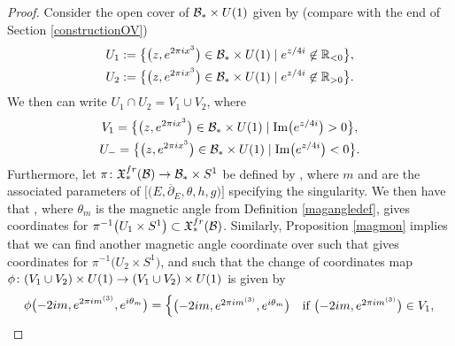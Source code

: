 \documentclass[11pt]{article}
\numberwithin{equation}{section}
\numberwithin{equation}{section}
\begin{document}
\begin{proof}
Consider the open cover of $\mathcal{B}_*\times {\rm U}(1)$ given by (compare with the end of Section \ref{constructionOV})
\begin{gather*}
 U_1:=\bigl\{\bigl(z,{\rm e}^{2\pi{\rm i}x^{3}}\bigr) \in \mathcal{B}_*\times {\rm U}(1) \mid {\rm e}^{z/4{\rm i}}\not\in \mathbb{R}_{<0} \bigr\}, \\
 U_2:=\bigl\{\bigl(z,{\rm e}^{2\pi{\rm i}x^{3}}\bigr) \in \mathcal{B}_*\times {\rm U}(1) \mid {\rm e}^{z/4{\rm i}}\not\in \mathbb{R}_{>0} \bigr\}.
\end{gather*}
We then can write $U_1\cap U_2= V_1\cup V_2$, where
\begin{gather*}
 V_1=\bigl\{\bigl(z,{\rm e}^{2\pi {\rm i}x^3}\bigr) \in \mathcal{B}_*\times {\rm U}(1) \mid \operatorname{Im}\bigl({\rm e}^{z/4{\rm i}}\bigr)>0\bigr\}, \\
 U_{-}=\bigl\{\bigl(z,{\rm e}^{2\pi {\rm i}x^3}\bigr) \in \mathcal{B}_*\times {\rm U}(1) \mid \operatorname{Im}\bigl({\rm e}^{z/4{\rm i}}\bigr)<0\bigr\}.
\end{gather*}
Furthermore, let $\pi\colon \mathfrak{X}_*^{{\rm fr}}(\mathcal{B}) \to \mathcal{B}_*\times S^1$ be defined by , where $m$ and  are the associated parameters of $\bigl[\bigl(E,\overline{\partial}_E,\theta,h,g\bigr)\bigr]$ specifying the singularity. We then have that , where $\theta_m$ is the magnetic angle from Definition \ref{magangledef}, gives coordinates for $\pi^{-1}\bigl(U_1\times S^1\bigr)\subset \mathfrak{X}_*^{{\rm fr}}(\mathcal{B})$. Similarly, Proposition \ref{magmon} implies that we can find another magnetic angle coordinate  over  such that  gives coordinates for $\pi^{-1}\bigl(U_2\times S^1\bigr)$, and such that the change of coordinates map $\phi\colon (V_1\cup V_2)\times {\rm U}(1) \to (V_1\cup V_2)\times {\rm U}(1)$ is given by
\begin{equation*}
 \phi\bigl(-2{\rm i}m,{\rm e}^{2\pi {\rm i} m^{(3)}},{\rm e}^{{\rm i}\theta_m}\bigr)=\begin{cases}
 \bigl(-2{\rm i}m,{\rm e}^{2\pi {\rm i} m^{(3)}},{\rm e}^{{\rm i}\theta_m}\bigr)& \text{if} \ \bigl(-2{\rm i}m,{\rm e}^{2\pi {\rm i} m^{(3)}}\bigr) \in V_1,\\

\end{cases}
\end{equation*}
\end{proof}
\end{document}
